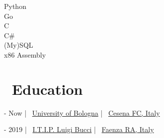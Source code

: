 \documentclass{article}
\begin{document}
\begin{paracol}{2}
\begin{tcolorbox}[title=\faCode \ Programming,colback=white,arc=0pt]
     Python \\[0pt]
     Go \\[4pt]
     C \\[4pt]
     C\# \\[4pt]
     (My)SQL \\[4pt]
     x86 Assembly
\end{tcolorbox}

\vspace{35pt}
\begin{center}
    \hypersetup{urlcolor=black}
\end{center}
\vspace{35pt}

\switchcolumn

\maketitle

%
%

\vfill

\section*{\faBook \ Education}

\begin{tcolorbox}[
    title=\faBookOpen \ \href
        {https://corsi.unibo.it/1cycle/ComputerScienceEngineering}
        {Bachelor in Computer Science and Engineering}
    ,
    colback=white,
    arc=0pt
]
     - Now \hfill | \hfill
    \faUniversity \ \href{https://www.unibo.it/en/}{University of Bologna} \hfill | \hfill
    \faCity \ \href{https://www.openstreetmap.org/relation/9713588}{Cesena FC, Italy}
\end{tcolorbox}

\begin{tcolorbox}[title=\faBook \ High School Diploma in Information Technology,colback=white,arc=0pt]
     - 2019 \hfill | \hfill
    \faSchool \ \href{https://www.itipfaenza.edu.it/}{I.T.I.P. Luigi Bucci} \hfill | \hfill
    \faCity \ \href{https://www.openstreetmap.org/relation/2227656}{Faenza RA, Italy}
\end{tcolorbox}


\end{paracol}
\end{document}

